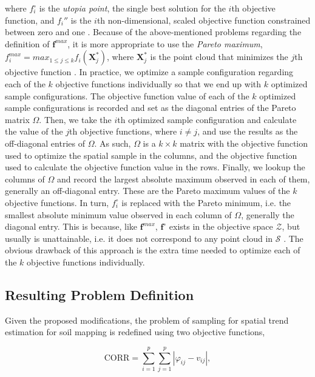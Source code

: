 \noindent where $f_i^{\circ}$ is the \emph{utopia point}, the single best solution for the $i$th objective 
function, and $f_i''$ is the $i$th non-dimensional, scaled objective function constrained between zero and one 
\cite{MarlerEtAl2005}. Because of the above-mentioned problems regarding the definition of 
$\boldsymbol{f}^{max}$, it is more appropriate to use the \emph{Pareto maximum}, $f_i^{max} = max_{1 \leq j 
\leq k} f_ i(\boldsymbol{X}_j^*)$, where $\boldsymbol{X}_j^*$ is the point cloud that minimizes the $j$th 
objective function \cite{MarlerEtAl2005}. In practice, we optimize a sample configuration regarding each of the 
$k$ objective functions individually so that we end up with $k$ optimized sample configurations. The objective 
function value of each of the $k$ optimized sample configurations is recorded and set as the diagonal entries 
of the Pareto matrix $\varOmega$. Then, we take the $i$th optimized sample configuration and calculate the 
value of the $j$th objective functions, where $i \neq j$, and use the results as the off-diagonal entries of 
$\varOmega$. As such, $\varOmega$ is a $k \times k$ matrix with the objective function used to optimize the 
spatial sample in the columns, and the objective function used to calculate the objective function value in the 
rows. Finally, we lookup the columns of $\varOmega$ and record the largest absolute maximum observed in each of 
them, generally an off-diagonal entry. These are the Pareto maximum values of the $k$ objective functions. In 
turn, $f_i^{\circ}$ is replaced with the Pareto minimum, i.e. the smallest absolute minimum value observed in 
each column of $\varOmega$, generally the diagonal entry. This is because, like $\boldsymbol{f}^{max}$, 
$\boldsymbol{f}^{\circ}$ exists in the objective space $\mathcal{Z}$, but usually is unattainable, i.e. it does 
not correspond to any point cloud in $\mathcal{S}$ \cite{Arora2011}. The obvious drawback of this approach is 
the extra time needed to optimize each of the $k$ objective functions individually.

\subsection{Resulting Problem Definition}

Given the proposed modifications, the problem of sampling for spatial trend estimation for soil mapping is 
redefined using two objective functions,

\begin{equation}\label{eqn:chap08-corr}
 \text{CORR} = \sum_{i=1}^{p}\sum_{j=1}^{p}|\varphi_{ij} - v_{ij}|,
\end{equation}

